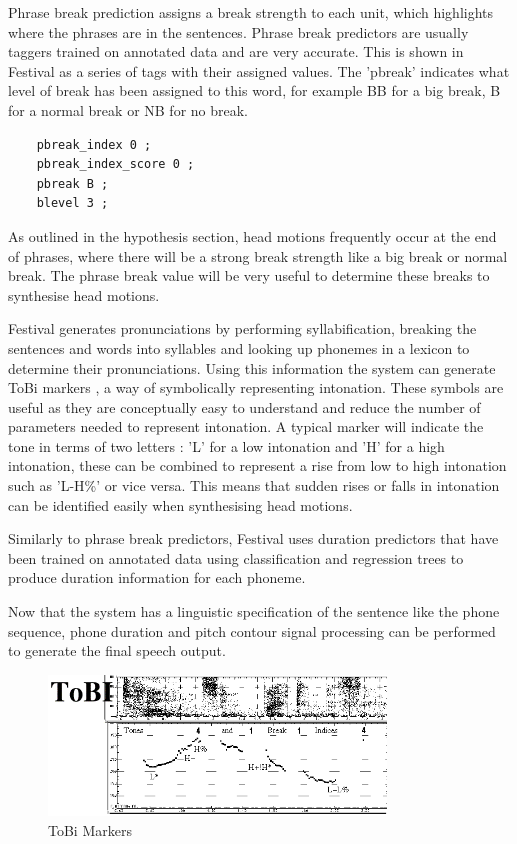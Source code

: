 \documentclass[bsc,frontabs,twoside,singlespacing,parskip,deptreport]{infthesis}
\begin{document}
Phrase break prediction assigns a break strength to each unit, which highlights where the phrases are in the sentences. Phrase break predictors are usually taggers trained on annotated data and are very accurate. This is shown in Festival as a series of tags with their assigned values. The 'pbreak' indicates what level of break has been assigned to this word, for example BB for a big break, B for a normal break or NB for no break.

\begin{lstlisting}
	pbreak_index 0 ;
	pbreak_index_score 0 ;
	pbreak B ; 
	blevel 3 ; 
\end{lstlisting}

As outlined in the hypothesis section, head motions frequently occur at the end of phrases, where there will be a strong break strength like a big break or normal break. The phrase break value will be very useful to determine these breaks to synthesise head motions.

Festival generates pronunciations by performing syllabification, breaking the sentences and words into syllables and looking up phonemes in a lexicon to determine their pronunciations. Using this information the system can generate ToBi markers \cite{tobi}, a way of symbolically representing intonation. These symbols are useful as they are conceptually easy to understand and reduce the number of parameters needed to represent intonation. A typical marker will indicate the tone in terms of two letters : 'L' for a low intonation and 'H' for a high intonation, these can be combined to represent a rise from low to high intonation such as 'L-H\%' or vice versa.  This means that sudden rises or falls in intonation can be identified easily when synthesising head motions. 

Similarly to phrase break predictors, Festival uses duration predictors that have been trained on annotated data using classification and regression trees to produce duration information for each phoneme.

Now that the system has a linguistic specification of the sentence like the phone sequence, phone duration and pitch contour signal processing can be performed to generate the final speech output.

\begin{figure}[h!]
	\centering
	\includegraphics[width=0.8\textwidth]{tobi.png}
	\caption{ToBi Markers \cite{tobi}}
\end{figure}
\end{document}
